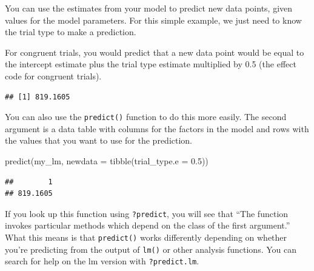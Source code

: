 \documentclass[
  oneside]{book}
\newenvironment{Shaded}{\begin{snugshade}}{\end{snugshade}}
\newcommand{\AttributeTok}[1]{\textcolor[rgb]{0.77,0.63,0.00}{#1}}
\newcommand{\FloatTok}[1]{\textcolor[rgb]{0.00,0.00,0.81}{#1}}
\newcommand{\FunctionTok}[1]{\textcolor[rgb]{0.00,0.00,0.00}{#1}}
\newcommand{\NormalTok}[1]{#1}
\newcommand{\OtherTok}[1]{\textcolor[rgb]{0.56,0.35,0.01}{#1}}
\newcommand{\SpecialCharTok}[1]{\textcolor[rgb]{0.00,0.00,0.00}{#1}}
\newcommand{\StringTok}[1]{\textcolor[rgb]{0.31,0.60,0.02}{#1}}
\begin{document}
You can use the estimates from your model to predict new data points, given values for the model parameters. For this simple example, we just need to know the trial type to make a prediction.

For congruent trials, you would predict that a new data point would be equal to the intercept estimate plus the trial type estimate multiplied by 0.5 (the effect code for congruent trials).

\begin{Shaded}
\end{Shaded}

\begin{verbatim}
## [1] 819.1605
\end{verbatim}

You can also use the \texttt{predict()} function to do this more easily. The second argument is a data table with columns for the factors in the model and rows with the values that you want to use for the prediction.

\begin{Shaded}
\begin{Highlighting}[]
\FunctionTok{predict}\NormalTok{(my\_lm, }\AttributeTok{newdata =} \FunctionTok{tibble}\NormalTok{(}\AttributeTok{trial\_type.e =} \FloatTok{0.5}\NormalTok{))}
\end{Highlighting}
\end{Shaded}

\begin{verbatim}
##        1 
## 819.1605
\end{verbatim}

\begin{info}
If you look up this function using \texttt{?predict}, you will see that ``The function invokes particular methods which depend on the class of the first argument.''
What this means is that \texttt{predict()} works differently depending on whether you're predicting from the output of \texttt{lm()} or other analysis functions. You can search for help on the lm version with \texttt{?predict.lm}.

\end{info}
\end{document}

